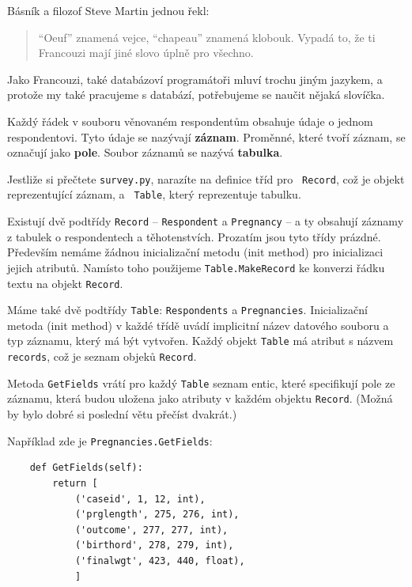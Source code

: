 \documentclass[12pt]{book}
\begin{document}
Básník a filozof Steve Martin jednou řekl:
%
\begin{quote}
``Oeuf'' znamená vejce, ``chapeau'' znamená klobouk.  Vypadá to, že ti Francouzi mají jiné slovo úplně pro všechno.
\end{quote}
%
Jako Francouzi, také databázoví programátoři mluví trochu jiným jazykem, a protože my také pracujeme s databází, potřebujeme se naučit nějaká slovíčka.

Každý řádek v souboru věnovaném respondentům obsahuje údaje o jednom respondentovi. Tyto údaje se nazývají {\bf záznam}.  Proměnné, které tvoří záznam, se označují jako {\bf pole}.  Soubor záznamů se nazývá {\bf tabulka}.

Jestliže si přečtete {\tt survey.py}, narazíte na definice tříd pro {\tt
  Record}, což je objekt reprezentující záznam, a {\tt
  Table}, který reprezentuje tabulku.

Existují dvě podtřídy {\tt Record} -- {\tt Respondent} a {\tt Pregnancy} --  a ty obsahují záznamy z tabulek o respondentech a těhotenstvích. Prozatím jsou tyto třídy prázdné. Především nemáme žádnou inicializační metodu (init method) pro inicializaci jejich atributů. Namísto toho použijeme {\tt Table.MakeRecord} ke konverzi řádku textu na objekt {\tt Record}.

Máme také dvě podtřídy {\tt Table}: {\tt Respondents}
a {\tt Pregnancies}.  Inicializační metoda (init method) v každé třídě uvádí implicitní název datového souboru a typ záznamu, který má být vytvořen. Každý objekt {\tt Table} má atribut s názvem {\tt records}, což je seznam objeků {\tt Record}.

Metoda {\tt GetFields} vrátí pro každý {\tt Table} seznam entic, které specifikují pole ze záznamu, která budou uložena jako atributy v každém objektu {\tt Record}. (Možná by bylo dobré si poslední větu přečíst dvakrát.)

Například zde je {\tt Pregnancies.GetFields}:
%
\begin{verbatim}
    def GetFields(self):
        return [
            ('caseid', 1, 12, int),
            ('prglength', 275, 276, int),
            ('outcome', 277, 277, int),
            ('birthord', 278, 279, int),
            ('finalwgt', 423, 440, float),
            ]
\end{verbatim}
\end{document}

